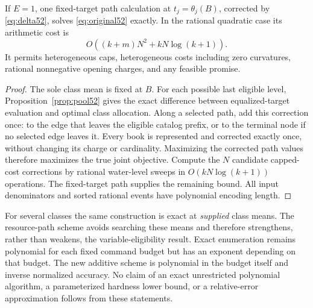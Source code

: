 \begin{theorem}\label{thm:common52}
If $E=1$, one fixed-target path calculation at $t_j=\theta_j(B)$, corrected by \eqref{eq:delta52}, solves \eqref{eq:original52} exactly. In the rational quadratic case its arithmetic cost is
\[
 O((k+m)N^2+kN\log(k+1)).
\]
It permits heterogeneous caps, heterogeneous costs including zero curvatures, rational nonnegative opening charges, and any feasible promise.
\end{theorem}
\begin{proof}
The sole class mean is fixed at $B$. For each possible last eligible level, Proposition~\ref{prop:pool52} gives the exact difference between equalized-target evaluation and optimal class allocation. Along a selected path, add this correction once: to the edge that leaves the eligible catalog prefix, or to the terminal node if no selected edge leaves it. Every book is represented and corrected exactly once, without changing its charge or cardinality. Maximizing the corrected path values therefore maximizes the true joint objective. Compute the $N$ candidate capped-cost corrections by rational water-level sweeps in $O(kN\log(k+1))$ operations. The fixed-target path supplies the remaining bound. All input denominators and sorted rational events have polynomial encoding length.
\end{proof}

For several classes the same construction is exact at \emph{supplied} class means. The resource-path scheme avoids searching these means and therefore strengthens, rather than weakens, the variable-eligibility result. Exact enumeration remains polynomial for each fixed command budget but has an exponent depending on that budget. The new additive scheme is polynomial in the budget itself and inverse normalized accuracy. No claim of an exact unrestricted polynomial algorithm, a parameterized hardness lower bound, or a relative-error approximation follows from these statements.

